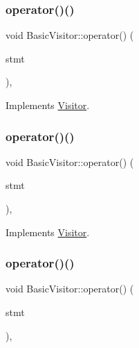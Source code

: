 \subsubsection{\texorpdfstring{operator()()}{operator()()}\hspace{0.1cm}{\footnotesize\ttfamily [34/59]}}
{\footnotesize\ttfamily void Basic\+Visitor\+::operator() (\begin{DoxyParamCaption}\item[{const \hyperlink{struct_return_statement}{Return\+Statement} \&}]{stmt }\end{DoxyParamCaption})\hspace{0.3cm}{\ttfamily [inline]}, {\ttfamily [virtual]}}



Implements \hyperlink{struct_visitor_a041431785a00f9f387c7bc670b3ac660}{Visitor}.

\mbox{\label{struct_basic_visitor_adef187cc02193116879f4697488ddabf}} 
\subsubsection{\texorpdfstring{operator()()}{operator()()}\hspace{0.1cm}{\footnotesize\ttfamily [35/59]}}
{\footnotesize\ttfamily void Basic\+Visitor\+::operator() (\begin{DoxyParamCaption}\item[{const \hyperlink{struct_with_statement}{With\+Statement} \&}]{stmt }\end{DoxyParamCaption})\hspace{0.3cm}{\ttfamily [inline]}, {\ttfamily [virtual]}}



Implements \hyperlink{struct_visitor_a16b17bbc1c01ed7ce1a0153b5c4c43a6}{Visitor}.

\mbox{\label{struct_basic_visitor_af81c51e8a36db9ab923df747463afc11}} 
\subsubsection{\texorpdfstring{operator()()}{operator()()}\hspace{0.1cm}{\footnotesize\ttfamily [36/59]}}
{\footnotesize\ttfamily void Basic\+Visitor\+::operator() (\begin{DoxyParamCaption}\item[{const \hyperlink{struct_labelled_statement}{Labelled\+Statement} \&}]{stmt }\end{DoxyParamCaption})\hspace{0.3cm}{\ttfamily [inline]}, {\ttfamily [virtual]}}



